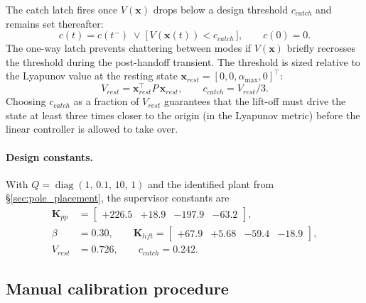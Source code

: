\documentclass[11pt,a4paper]{article}
\begin{document}
The catch latch fires once $V(\mathbf{x})$ drops below a design threshold $c_{catch}$ and remains set thereafter:
\begin{equation}
    c(t) = c(t^-) \;\lor\; \big[\,V(\mathbf{x}(t)) < c_{catch}\,\big], \qquad c(0)=0.
    \label{eq:catch_latch}
\end{equation}
The one-way latch prevents chattering between modes if $V(\mathbf{x})$ briefly recrosses the threshold during the post-handoff transient. The threshold is sized relative to the Lyapunov value at the resting state $\mathbf{x}_{rest} = [0,0,\alpha_{\max},0]^\top$:
\begin{equation}
    V_{rest} = \mathbf{x}_{rest}^{\top} P \,\mathbf{x}_{rest},
    \qquad
    c_{catch} = V_{rest}/3.
    \label{eq:c_catch}
\end{equation}
Choosing $c_{catch}$ as a fraction of $V_{rest}$ guarantees that the lift-off must drive the state at least three times closer to the origin (in the Lyapunov metric) before the linear controller is allowed to take over.

\paragraph{Design constants.}
With $Q = \operatorname{diag}(1,\,0.1,\,10,\,1)$ and the identified plant from \S\ref{sec:pole_placement}, the supervisor constants are
\begin{align}
    \mathbf{K}_{pp}   &= \begin{bmatrix} +226.5 & +18.9 & -197.9 & -63.2 \end{bmatrix}, \\
    \beta             &= 0.30, \qquad
    \mathbf{K}_{lift} = \begin{bmatrix} +67.9 & +5.68 & -59.4 & -18.9 \end{bmatrix}, \\
    V_{rest}          &= 0.726,\qquad
    c_{catch}         = 0.242.
\end{align}

\subsection{Manual calibration procedure}
\label{ssec:liftoff_calibration}
\end{document}
